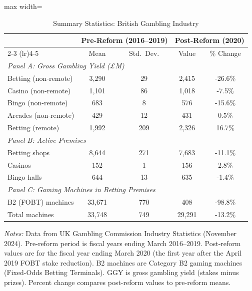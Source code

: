\begin{table}[H]
\centering
\caption{Summary Statistics: British Gambling Industry}
\begin{threeparttable}
\begin{adjustbox}{max width=\textwidth}
\begin{tabular}{lcccc}
\toprule
 & \multicolumn{2}{c}{Pre-Reform (2016--2019)} & \multicolumn{2}{c}{Post-Reform (2020)} \\
\cmidrule(lr){2-3} \cmidrule(lr){4-5}
 & Mean & Std.\ Dev. & Value & \% Change \\
\midrule
\multicolumn{5}{l}{\textit{Panel A: Gross Gambling Yield (\pounds M)}} \\
\quad Betting (non-remote) & 3,290 & 29 & 2,415 & -26.6\% \\
\quad Casino (non-remote) & 1,101 & 86 & 1,018 & -7.5\% \\
\quad Bingo (non-remote) & 683 & 8 & 576 & -15.6\% \\
\quad Arcades (non-remote) & 429 & 12 & 431 & 0.5\% \\
\quad Betting (remote) & 1,992 & 209 & 2,326 & 16.7\% \\
\midrule
\multicolumn{5}{l}{\textit{Panel B: Active Premises}} \\
\quad Betting shops & 8,644 & 271 & 7,683 & -11.1\% \\
\quad Casinos & 152 & 1 & 156 & 2.8\% \\
\quad Bingo halls & 644 & 13 & 635 & -1.4\% \\
\midrule
\multicolumn{5}{l}{\textit{Panel C: Gaming Machines in Betting Premises}} \\
\quad B2 (FOBT) machines & 33,671 & 770 & 408 & -98.8\% \\
\quad Total machines & 33,748 & 749 & 29,291 & -13.2\% \\
\bottomrule
\end{tabular}
\end{adjustbox}
\begin{tablenotes}[flushleft]
\small
\item \textit{Notes:} Data from UK Gambling Commission Industry Statistics (November 2024). Pre-reform period is fiscal years ending March 2016--2019. Post-reform values are for the fiscal year ending March 2020 (the first year after the April 2019 FOBT stake reduction). B2 machines are Category B2 gaming machines (Fixed-Odds Betting Terminals). GGY is gross gambling yield (stakes minus prizes). Percent change compares post-reform values to pre-reform means.
\end{tablenotes}
\end{threeparttable}
\label{tab:summary}
\end{table}


